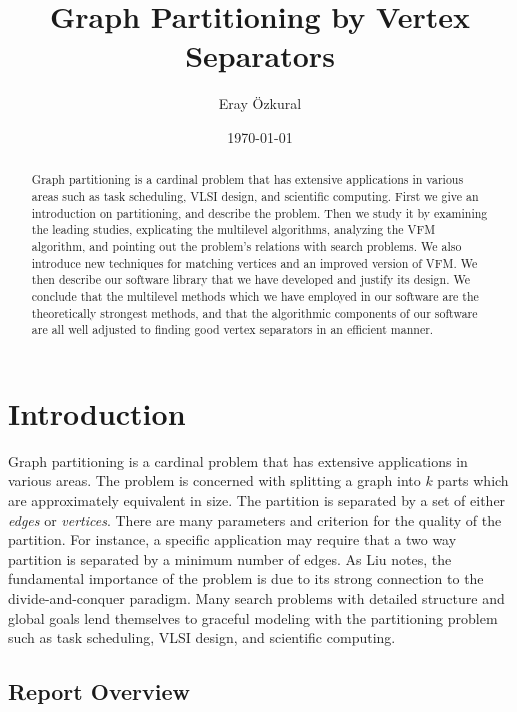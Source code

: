 \documentclass[a4paper,12pt]{article}
\title{Graph Partitioning by Vertex Separators}
\author{Eray \"Ozkural}
\date{\today}
\begin{document}
\maketitle
\begin{abstract}
Graph partitioning is a cardinal problem that has extensive
applications in various areas such
as task scheduling, VLSI design, and scientific computing. 
First we give an introduction on partitioning, and describe the
problem. Then we study it by examining the leading studies,
explicating the multilevel algorithms, analyzing the VFM algorithm, and
pointing out the problem's relations with search problems.
We also introduce new techniques for matching vertices and
an improved version of VFM. We then describe our software library that
we have developed and justify its design.
We conclude that the multilevel methods which we have employed in our
software are the theoretically strongest methods, and that the
algorithmic components of our software are all well adjusted to
finding good vertex separators in an efficient manner.

\end{abstract}

\tableofcontents
\listoffigures
\pagebreak

\section{Introduction}

Graph partitioning is a cardinal problem that has extensive
applications in various areas. The problem is concerned with
splitting a graph into $k$ parts which are approximately equivalent
in size. The partition is separated by a set of either \textsl{edges}
or \textsl{vertices}. There are many parameters and criterion for the
quality of the partition. For instance, a specific application may
require that a two way partition is separated by a minimum number of
edges. As Liu \cite{liu} notes, the fundamental importance of the
problem is due to its strong connection to the divide-and-conquer
paradigm. Many search problems with detailed structure and global
goals lend themselves to graceful modeling with the partitioning problem such
as task scheduling, VLSI design, and scientific computing. 

\subsection{Report Overview}
\end{document}
